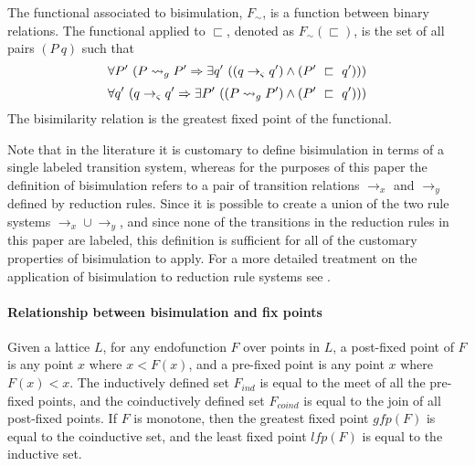 \begin{definition}
\label{bisimulation}
The functional associated to bisimulation,  $F_\sim$, is a function between binary relations. The functional applied to $\sqsubset$, denoted as $F_\sim(\sqsubset)$, is the set of all pairs
$(P\ q)$ such that
\begin{equation}
\label{eqn:BisimulationForwards}
\forall P^\prime\ ( P \leadsto_{g} P^\prime \Rightarrow \exists q^\prime\ ( (q \rightarrow_{\varsigma} q^\prime )\wedge (P^\prime\ \sqsubset\ q^\prime )))
\end{equation}
\begin{equation}
\label{eqn:BisimulationBackwards}
\forall q^\prime\ ( q \rightarrow_{\varsigma} q^\prime\Rightarrow \exists P^\prime\ ( (P \leadsto_{g} P^\prime )\wedge (P^\prime\ \sqsubset\ q^\prime )))
\end{equation}
The bisimilarity relation is the greatest fixed point of the functional.
\end{definition}

Note that in the literature it is customary to define bisimulation in
terms of a single labeled transition system, whereas for the purposes
of this paper the definition of bisimulation refers to a pair of
transition relations $\rightarrow_x$ and $\rightarrow_y$ defined by
reduction rules. Since it is possible to create a union of the two
rule systems $\rightarrow_x \cup \rightarrow_y$, and since none of the
transitions in the reduction rules in this paper are labeled, this
definition is sufficient for all of the customary properties of
bisimulation to apply. 
For a more detailed treatment on the
application of bisimulation to reduction rule systems see
\cite{Sangiorgi:2011}.

\paragraph{Relationship between bisimulation and fix points}

Given a lattice $L$, for any endofunction $F$ over points in $L$, 
a post-fixed point of $F$ is any point $x$ where $x < F(x)$, and a pre-fixed 
point is any point $x$ where $F(x) < x$. The inductively defined set $F_\mathit{ind}$
is equal to the meet of all the pre-fixed points, and the coinductively 
defined set $F_\mathit{coind}$ is equal to the join of all post-fixed points. 
If $F$ is monotone, then the greatest fixed point $\mathit{gfp}(F)$ 
is equal to the coinductive set, and the least fixed point $\mathit{lfp}(F)$ is equal to the 
inductive set.

